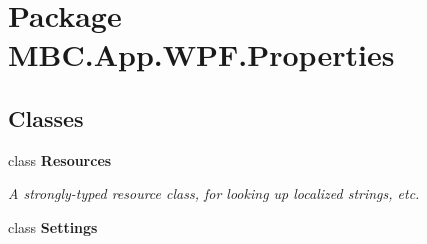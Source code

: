 \hypertarget{namespace_m_b_c_1_1_app_1_1_w_p_f_1_1_properties}{\section{Package M\-B\-C.\-App.\-W\-P\-F.\-Properties}
\label{namespace_m_b_c_1_1_app_1_1_w_p_f_1_1_properties}
}
\subsection*{Classes}
\begin{DoxyCompactItemize}
\item 
class {\bfseries Resources}
\begin{DoxyCompactList}\small\item\em A strongly-\/typed resource class, for looking up localized strings, etc. \end{DoxyCompactList}\item 
class {\bfseries Settings}
\end{DoxyCompactItemize}
